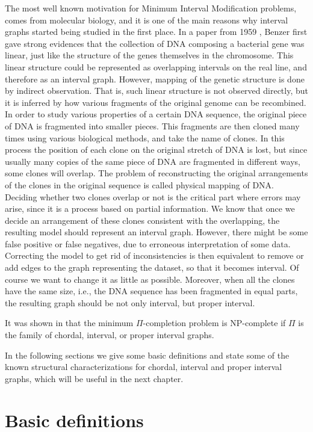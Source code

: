 \documentclass[12pt]{book}
\theoremstyle{plain}
\theoremstyle{remark}
\begin{document}
The most well known motivation for Minimum Interval Modification problems, comes from molecular biology, and it is one of the main reasons why interval graphs started being studied in the first place. In a paper from 1959 \cite{B59}, Benzer first gave strong evidences that the collection of DNA composing a bacterial gene was linear, just like the structure of the genes themselves in the chromosome. This linear structure could be represented as overlapping intervals on the real line, and therefore as an interval graph. However, mapping of the genetic structure is done by indirect observation. That is, such linear structure is not observed directly, but it is inferred by how various fragments of the original genome can be recombined.
In order to study various properties of a certain DNA sequence, the original piece of DNA is fragmented into smaller pieces. This fragments are then cloned many times using various biological methods, and take the name of clones. In this process the position of each clone on the original stretch of DNA is lost, but since usually many copies of the same piece of DNA are fragmented in different ways, some clones will overlap. The problem of reconstructing the original arrangements of the clones in the original sequence is called physical mapping of DNA. Deciding whether two clones overlap or not is the critical part where errors may arise, since it is a process based on partial information. We know that once we decide an arrangement of these clones consistent with the overlapping, the resulting model should represent an interval graph. However, there might be some false positive or false negatives, due to erroneous interpretation of some data. Correcting the model to get rid of inconsistencies is then equivalent to remove or add edges to the graph representing the dataset, so that it becomes interval. Of course we want to change it as little as possible. Moreover, when all the clones have the same size, i.e., the DNA sequence has been fragmented in equal parts, the resulting graph should be not only interval, but proper interval.

It was shown in \cite{KF79, Y81, GJ79, GGKS95} that the minimum $\Pi$-completion problem is NP-complete if $\Pi$ is the family of chordal, interval, or proper interval graphs.

In the following sections we give some basic definitions and state some of the known structural characterizations for chordal, interval and proper interval graphs, which will be useful in the next chapter.


\section{Basic definitions}
\end{document}

